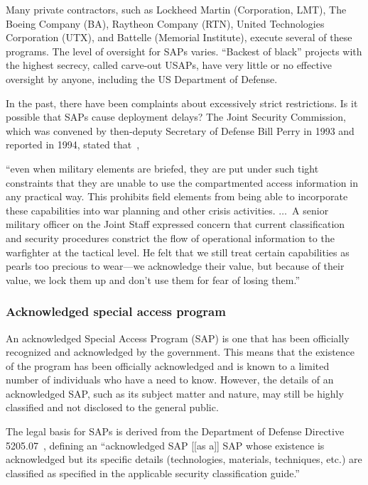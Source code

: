 Many private contractors, such as Lockheed Martin (Corporation, LMT), The Boeing Company (BA), Raytheon Company (RTN), United Technologies Corporation (UTX), and Battelle (Memorial Institute), execute several of these programs. The level of oversight for SAPs varies. ``Backest of black'' projects with the highest secrecy, called carve-out USAPs, have very little or no effective oversight by anyone, including the US Department of Defense.

In the past, there have been complaints about excessively strict restrictions. Is it possible that SAPs cause deployment delays? The Joint Security Commission, which was convened by then-deputy Secretary of Defense Bill Perry in 1993 and reported in 1994, stated that~\cite[p.~18-19]{RedefiningSecurity},
\begin{svgraybox}
``even when military elements are briefed, they are put under
such tight constraints that they are unable to use the compartmented access
information in any practical way. This prohibits field elements from being
able to incorporate these capabilities into war planning and other crisis activities.
$\ldots$~A senior military officer on the Joint Staff expressed concern that current
classification and security procedures constrict the flow of operational
information to the warfighter at the tactical level. He felt that we still treat
certain capabilities as pearls too precious to wear---we acknowledge their
value, but because of their value, we lock them up and don't use them for
fear of losing them.''
\end{svgraybox}

\subsubsection{Acknowledged special access program}


An acknowledged Special Access Program (SAP) is one that has been officially recognized and acknowledged by the government. This means that the existence of the program has been officially acknowledged and is known to a limited number of individuals who have a need to know. However, the details of an acknowledged SAP, such as its subject matter and nature, may still be highly classified and not disclosed to the general public.


The legal basis for  SAPs is derived from the Department of Defense Directive 5205.07~\cite{DODDirective5205.07}, defining
an ``acknowledged SAP [[as a]] SAP whose existence is acknowledged but its specific details
(technologies, materials, techniques, etc.) are classified as specified in the applicable security
classification guide.''

